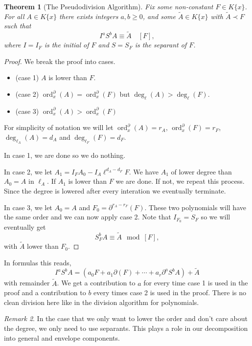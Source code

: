 \documentclass[12pt]{book}
\numberwithin{equation}{section}
\newtheorem{theorem}{Theorem}[subsection]
\theoremstyle{definition}
\theoremstyle{remark}
\newtheorem{remark}[theorem]{Remark}
\newcommand{\ord}{\operatorname{ord}}
\begin{document}
\begin{theorem}[The Pseudodivision Algorithm]\label{T:ode-pseudodivision}
	Fix some non-constant $F \in K\lbrace x \rbrace$. 
	For all $A \in K\lbrace x \rbrace$ there exists integers $a,b\geq 0$, and some $\widetilde{A}\in K\lbrace x \rbrace$ with $\widetilde{A} \prec F$ such that 
	 $$ I^a S^b A \equiv \widetilde{A} \quad [F],$$
	where $I=I_F$ is the initial of $F$ and $S=S_F$ is the separant of $F$.
\end{theorem}
\begin{proof}
	We break the proof into cases. 
	\begin{itemize}
		\item (case 1) $A$ is lower than $F$. 
		\item (case 2) $\ord^{\partial}_x(A) = \ord^{\partial}_x(F)$ but $\deg_{\ell}(A) > \deg_{\ell}(F)$.
		\item (case 3) $\ord^{\partial}_x(A)>\ord^{\partial}_x(F)$
	\end{itemize}
    For simplicity of notation we will let $\ord^{\partial}_x(A) = r_A$, $\ord^{\partial}_x(F) = r_F$, $\deg_{\ell_A}(A)=d_A$ and $\deg_{\ell_F}(F)=d_F$.
    
    In case 1, we are done so we do nothing. 
    
    In case 2, we let $A_1= I_FA_0 - I_A\ell^{d_A-d_F}F$.
    We have $A_1$ of lower degree than $A_0=A$ in $\ell_A$. 
    If $A_1$ is lower than $F$ we are done. 
    If not, we repeat this process.
    Since the degree is lowered after every interation we eventually terminate. 
    
    In case 3, we let $A_0 = A$ and $F_0=\partial^{r_A-r_F}(F)$.
    These two polynomials will have the same order and we can now apply case 2. 
    Note that $I_{F_0} = S_F$ so we will eventually get 
     $$ S_F^b A \equiv \widetilde{A} \mod [F],$$
    with $\widetilde{A}$ lower than $F_0$. 
\end{proof}

In formulas this reads,
$$ I^a S^b A = (a_0F + a_1 \partial(F) + \cdots + a_r \partial^aS^b A) + \widetilde{A}$$ 
with remainder $\widetilde{A}$. 
We get a contribution to $a$ for every time case 1 is used in the proof and a contribution to $b$ every times case 2 is used in the proof. 
There is no clean division here like in the division algorithm for polynomials. 

\begin{remark}
	In the case that we only want to lower the order and don't care about the degree, we only need to use separants. 
	This plays a role in our decomposition into general and envelope components.
\end{remark}
\end{document}
